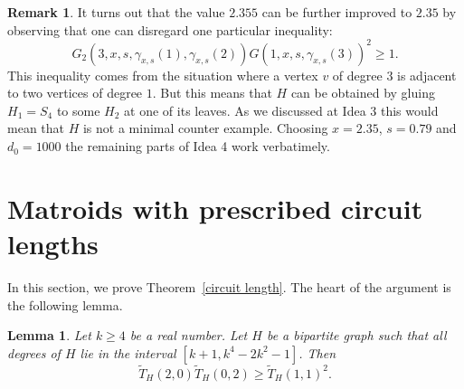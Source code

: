 \documentclass[12pt,a4paper]{amsart}
\numberwithin{equation}{section}
\theoremstyle{plain}
\newtheorem{Lemma}[Th]{Lemma}
\theoremstyle{definition}
\newtheorem{Rem}[Th]{Remark}
\newcommand{\1}{\textbf{1}}
\newcommand{\wT}{\widetilde{T}}
\begin{document}
\begin{Rem} It turns out that the value $2.355$ can be further improved to $2.35$ by observing that one can disregard one particular inequality:
$$G_2(3,x,s,\gamma_{x,s}(1),\gamma_{x,s}(2))G(1,x,s,\gamma_{x,s}(3))^2\geqslant1.$$
This inequality comes from the situation where a vertex $v$  of degree $3$ is adjacent to two vertices of degree $1$. But this means that $H$ can be obtained by gluing $H_1=S_4$ to some $H_2$ at one of its leaves. As we discussed at Idea 3 this would mean that $H$ is not a minimal counter example. Choosing $x=2.35$, $s=0.79$ and $d_0=1000$ the remaining parts of Idea 4 work verbatimely.


\end{Rem}



\section{Matroids with prescribed circuit lengths}
\label{sect: circuit_length}

In this section, we prove Theorem~\ref{circuit length}.
The heart of the argument is the following lemma.

\begin{Lemma} \label{lemma: circuit length}
Let $k\geqslant4$ be a real number. Let $H$ be a bipartite graph such that all degrees of $H$ lie in the interval $[k+1,k^4-2k^2-1]$. Then
$$\wT_H(2,0)\wT_H(0,2)\geqslant\wT_H(1,1)^2.$$
\end{Lemma}
\end{document}

